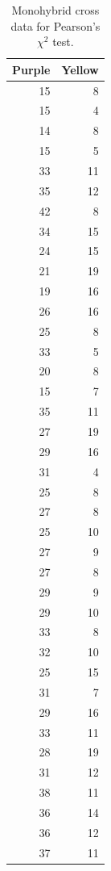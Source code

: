 \documentclass[]{book}
\theoremstyle{definition}
\theoremstyle{definition}
\theoremstyle{definition}
\theoremstyle{remark}
\begin{document}
\begin{table}

\caption{\label{tab:chi-squared}Monohybrid cross data for Pearson's \(\chi^2\) test.}
\centering
\begin{tabular}[t]{r|r}
\hline
Purple & Yellow\\
\hline
15 & 8\\
\hline
15 & 4\\
\hline
14 & 8\\
\hline
15 & 5\\
\hline
33 & 11\\
\hline
35 & 12\\
\hline
42 & 8\\
\hline
34 & 15\\
\hline
24 & 15\\
\hline
21 & 19\\
\hline
19 & 16\\
\hline
26 & 16\\
\hline
25 & 8\\
\hline
33 & 5\\
\hline
20 & 8\\
\hline
15 & 7\\
\hline
35 & 11\\
\hline
27 & 19\\
\hline
29 & 16\\
\hline
31 & 4\\
\hline
25 & 8\\
\hline
27 & 8\\
\hline
25 & 10\\
\hline
27 & 9\\
\hline
27 & 8\\
\hline
29 & 9\\
\hline
29 & 10\\
\hline
33 & 8\\
\hline
32 & 10\\
\hline
25 & 15\\
\hline
31 & 7\\
\hline
29 & 16\\
\hline
33 & 11\\
\hline
28 & 19\\
\hline
31 & 12\\
\hline
38 & 11\\
\hline
36 & 14\\
\hline
36 & 12\\
\hline
37 & 11\\
\hline
\end{tabular}
\end{table}
\end{document}
